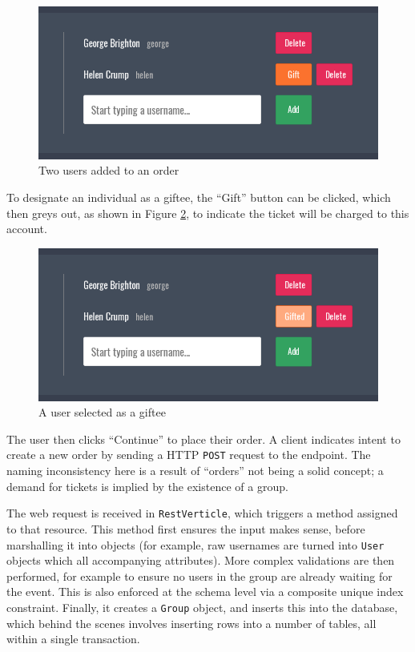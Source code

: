 \documentclass[12pt,a4paper]{bhamdissertation}
\newcommand{\code}[1]{\texttt{#1}}
\begin{document}
\begin{figure}[!htbp]
    \centering
    \includegraphics[width=1\linewidth]{img/order_attendees.png}
    \caption{Two users added to an order}
    \label{img:order_attendees}
\end{figure}

To designate an individual as a giftee, the ``Gift'' button can be clicked, which then greys out, as shown in Figure \ref{img:order_attendees_gifted}, to indicate the ticket will be charged to this account.

\begin{figure}[!htbp]
    \centering
    \includegraphics[width=1\linewidth]{img/order_attendees_gifted.png}
    \caption{A user selected as a giftee}
    \label{img:order_attendees_gifted}
\end{figure}

The user then clicks ``Continue'' to place their order. A client indicates intent to create a new order by sending a HTTP \code{POST} request to the \code{} endpoint. The naming inconsistency here is a result of ``orders'' not being a solid concept; a demand for tickets is implied by the existence of a group.

The web request is received in \code{RestVerticle}, which triggers a method assigned to that resource. This method first ensures the input makes sense, before marshalling it into objects (for example, raw usernames are turned into \code{User} objects which all accompanying attributes). More complex validations are then performed, for example to ensure no users in the group are already waiting for the event. This is also enforced at the schema level via a composite unique index constraint. Finally, it creates a \code{Group} object, and inserts this into the database, which behind the scenes involves inserting rows into a number of tables, all within a single transaction.
\end{document}
